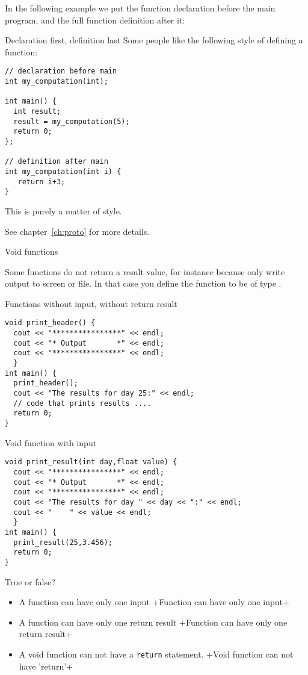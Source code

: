 In the following example we put the function declaration before the main program,
and the full function definition after it:

\begin{block}{Declaration first, definition last}
  \label{sl:proto-first}
  Some people like the following style of defining a function:
\begin{lstlisting}
// declaration before main
int my_computation(int);

int main() {
  int result;
  result = my_computation(5);
  return 0;
};

// definition after main
int my_computation(int i) {
   return i+3;
}
\end{lstlisting}
This is purely a matter of style.
\end{block}

See chapter~\ref{ch:proto} for more details.

 {Void functions}

Some functions do not return a result value,
for instance because only write
output to screen or file. In that case you define the function to be
of type .

\begin{block}{Functions without input, without return result}
  \label{sl:func-ex1}
\begin{lstlisting}
void print_header() {
  cout << "****************" << endl;
  cout << "* Output       *" << endl;
  cout << "****************" << endl;
  }
int main() {
  print_header();
  cout << "The results for day 25:" << endl;
  // code that prints results ....
  return 0;
}
\end{lstlisting}
\end{block}

\begin{block}{Void function with input}
  \label{sl:func-ex2}
\begin{lstlisting}
void print_result(int day,float value) {
  cout << "****************" << endl;
  cout << "* Output       *" << endl;
  cout << "****************" << endl;
  cout << "The results for day " << day << ":" << endl;
  cout << "    " << value << endl;
  }
int main() {
  print_result(25,3.456);
  return 0;
}
\end{lstlisting}
\end{block}

\begin{review}
  \label{rev:func-param}
  True or false?
  \begin{itemize}
  \item A function can have only one input
    \slackpollTF+Function can have only one input+
  \item A function can have only one return result
    \slackpollTF+Function can have only one return result+
  \item A void function can not have a \lstinline{return} statement.
    \slackpollTF+Void function can not have 'return'+
  \end{itemize}
\end{review}

